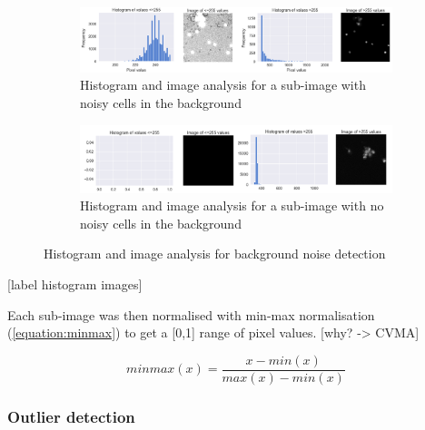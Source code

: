 \begin{figure}[h!]
    \centering
    \begin{subfigure}[h!]{0.99\textwidth}
        \includegraphics[width=\textwidth]{dissertation/figures/background_noise_true.png}
        \caption{Histogram and image analysis for a sub-image with noisy cells in the background}
        \label{fig:bgnoisetrue}
    \end{subfigure}

    \begin{subfigure}[h!]{0.99\textwidth}
        \includegraphics[width=\textwidth]{dissertation/figures/background_noise_false.png}
        \caption{Histogram and image analysis for a sub-image with no noisy cells in the background}
        \label{fig:bgnoisefalse}
    \end{subfigure}

    \caption{Histogram and image analysis for background noise detection}
    \label{fig:bgnoise}

\end{figure}

[label histogram images]

Each sub-image was then normalised with min-max normalisation (\autoref{equation:minmax}) to get a [0,1] range of pixel values. [why? -> CVMA]

\begin{equation}
    minmax(x) = \frac{x - min(x)}{max(x) - min(x)}
\label{equation:minmax}
\end{equation}

\bigskip
\subsubsection{Outlier detection}

